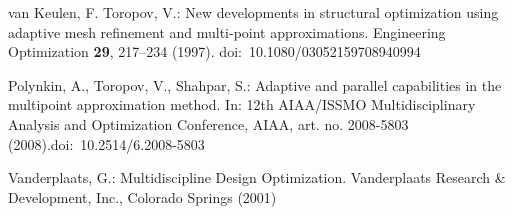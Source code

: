 \documentclass[a4paper]{llncs}
\begin{document}
\begin{thebibliography}{10}
van Keulen, F. Toropov, V.:
\newblock New developments in structural optimization using adaptive mesh refinement and multi-point approximations.
\newblock Engineering Optimization \textbf{29}, 217--234 (1997). doi:~10.1080/03052159708940994

Polynkin, A., Toropov, V., Shahpar, S.:
\newblock Adaptive and parallel capabilities in the multipoint approximation  method.
\newblock In: 12th AIAA/ISSMO Multidisciplinary Analysis and Optimization Conference, AIAA, art. no. 2008-5803
(2008).doi:~10.2514/6.2008-5803 

Vanderplaats, G.:
\newblock Multidiscipline Design Optimization.
\newblock Vanderplaats Research \& Development, Inc., Colorado Springs (2001)

\end{thebibliography}
\end{document}
